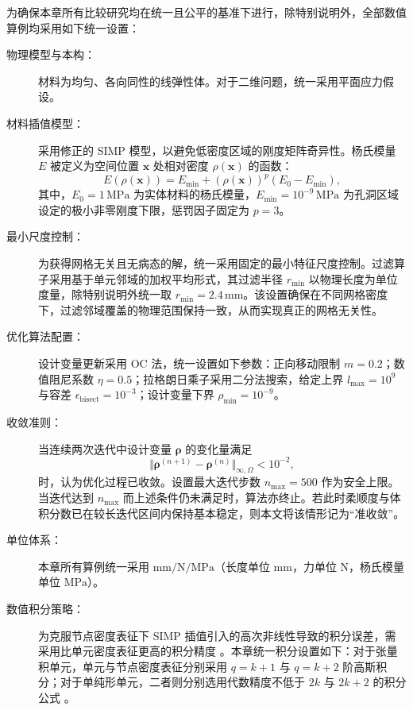 为确保本章所有比较研究均在统一且公平的基准下进行，除特别说明外，全部数值算例均采用如下统一设置：
\begin{description}
	\item[物理模型与本构：]材料为均匀、各向同性的线弹性体。对于二维问题，统一采用平面应力假设。

	\item [材料插值模型：]采用修正的 SIMP 模型，以避免低密度区域的刚度矩阵奇异性。杨氏模量 $E$ 被定义为空间位置 $\boldsymbol{x}$ 处相对密度 $\rho(\boldsymbol{x})$ 的函数：
	\[
	E(\rho(\boldsymbol{x})) = E_{\min} + (\rho(\boldsymbol{x}))^p (E_0 - E_{\min}),
	\]
	其中，$E_0 = 1\,\mathrm{MPa}$ 为实体材料的杨氏模量，$E_{\min} = 10^{-9}\,\mathrm{MPa}$ 为孔洞区域设定的极小非零刚度下限，惩罚因子固定为 $p=3$。
	
	\item [最小尺度控制：]为获得网格无关且无病态的解，统一采用固定的最小特征尺度控制。过滤算子采用基于单元邻域的加权平均形式，其过滤半径 $r_{\min}$ 以物理长度为单位度量，除特别说明外统一取 $r_{\min} = 2.4\,\mathrm{mm}$。该设置确保在不同网格密度下，过滤邻域覆盖的物理范围保持一致，从而实现真正的网格无关性。
	
	\item [优化算法配置：]设计变量更新采用 OC 法，统一设置如下参数：正向移动限制 $m=0.2$；数值阻尼系数 $\eta=0.5$；拉格朗日乘子采用二分法搜索，给定上界 $l_{\max}=10^9$ 与容差 $\epsilon_{\text{bisect}}=10^{-3}$；设计变量下界 $\rho_{\min}=10^{-9}$。
		
	\item [收敛准则：]当连续两次迭代中设计变量 $\boldsymbol{\rho}$ 的变化量满足 
	\[
	\Vert\boldsymbol{\rho}^{(n+1)} - \boldsymbol{\rho}^{(n)}\Vert_{\infty,\Omega} < 10^{-2},
	\]
	时，认为优化过程已收敛。设置最大迭代步数 $n_{\max} = 500$ 作为安全上限。当迭代达到 $n_{\max}$ 而上述条件仍未满足时，算法亦终止。若此时柔顺度与体积分数已在较长迭代区间内保持基本稳定，则本文将该情形记为“准收敛”。
	
	\item [单位体系：]本章所有算例统一采用 $\mathrm{mm}/\mathrm{N}/\mathrm{MPa}$（长度单位 $\mathrm{mm}$，力单位 $\mathrm{N}$，杨氏模量单位 $\mathrm{MPa}$）。
	
	\item [数值积分策略：]为克服节点密度表征下 SIMP 插值引入的高次非线性导致的积分误差，需采用比单元密度表征更高的积分精度 。本章统一积分设置如下：对于张量积单元，单元与节点密度表征分别采用 $q=k+1$ 与 $q=k+2$ 阶高斯积分；对于单纯形单元，二者则分别选用代数精度不低于 $2k$ 与 $2k+2$ 的积分公式 。

\end{description}


